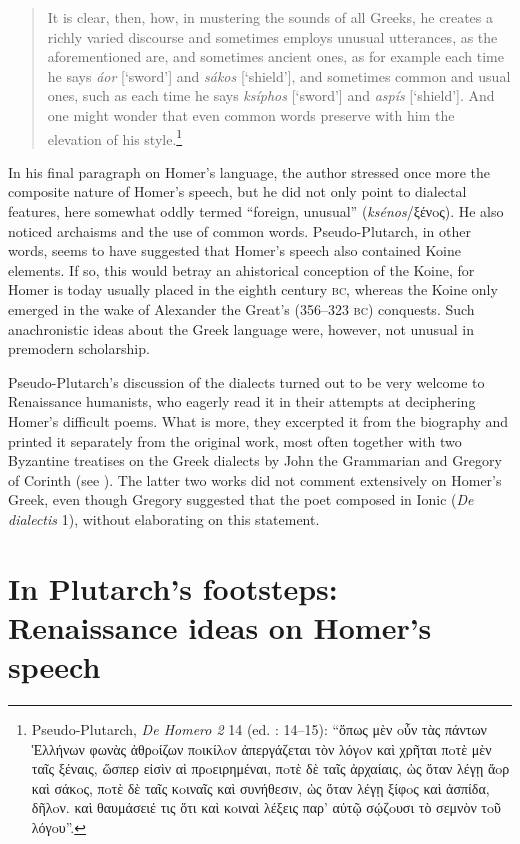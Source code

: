 \begin{quote}
It is clear, then, how, in mustering the sounds of all Greeks, he creates a richly varied discourse and sometimes employs unusual utterances, as the aforementioned are, and sometimes ancient ones, as for example each time he says \textit{áor} [‘sword’] and \textit{sákos} [‘shield’], and sometimes common and usual ones, such as each time he says \textit{ksíphos} [‘sword’] and \textit{aspís} [‘shield’]. And one might wonder that even common words preserve with him the elevation of his style.\footnote{Pseudo-Plutarch, \textit{De Homero 2} 14 (ed. \citealt{Kindstrand1990}: 14–15): “ὅπως μὲν oὖν τὰς πάντων Ἑλλήνων φωνὰς ἀθρoίζων πoικίλoν ἀπεργάζεται τὸν λόγoν καὶ χρῆται πoτὲ μὲν ταῖς ξέναις, ὥσπερ εἰσὶν αἱ πρoειρημέναι, πoτὲ δὲ ταῖς ἀρχαίαις, ὡς ὅταν λέγῃ ἄoρ καὶ σάκoς, πoτὲ δὲ ταῖς κoιναῖς καὶ συνήθεσιν, ὡς ὅταν λέγῃ ξίφoς καὶ ἀσπίδα, δῆλoν. καὶ θαυμάσειέ τις ὅτι καὶ κoιναὶ λέξεις παρ’ αὐτῷ σῴζoυσι τὸ σεμνὸν τoῦ λόγoυ”.}
\end{quote}

In his final paragraph on Homer’s language, the author stressed once more the composite nature of Homer’s speech, but he did not only point to dialectal features, here somewhat oddly termed “foreign, unusual” (\textit{ksénos}/ξένoς). He also noticed archaisms and the use of common words. Pseudo-Plutarch, in other words, seems to have suggested that Homer’s speech also contained Koine elements. If so, this would betray an ahistorical conception of the Koine, for Homer is today usually placed in the eighth century \textsc{bc}, whereas the Koine only emerged in the wake of Alexander the Great’s (356–323 \textsc{bc}) conquests. Such anachronistic ideas about the Greek language were, however, not unusual in premodern scholarship.

Pseudo-Plutarch’s discussion of the dialects turned out to be very welcome to Renaissance humanists, who eagerly read it in their attempts at deciphering Homer’s difficult poems. What is more, they excerpted it from the biography and printed it separately from the original work, most often together with two Byzantine treatises on the Greek dialects by John the Grammarian and Gregory of Corinth (see \citealt{VanRooy2018c}). The latter two works did not comment extensively on Homer’s Greek, even though Gregory suggested that the poet composed in Ionic (\textit{De dialectis} 1), without elaborating on this statement.

\section{In Plutarch’s footsteps: Renaissance ideas on Homer’s speech}\label{sec:4.2}

